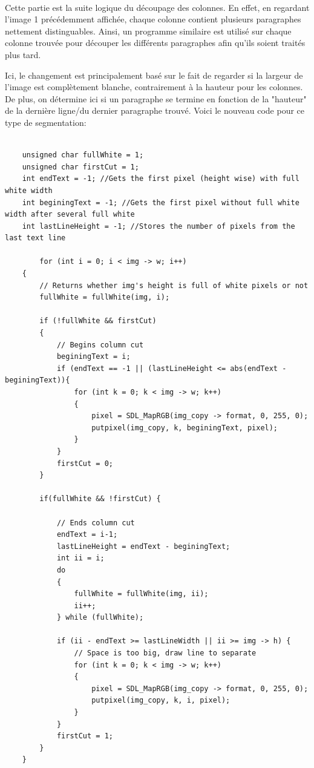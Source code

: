 \documentclass{article}
\begin{document}
	\paragraph{}
	Cette partie est la suite logique du découpage des colonnes. En effet, en regardant l'image 1 précédemment affichée, chaque colonne contient plusieurs paragraphes nettement distinguables. Ainsi, un programme similaire est utilisé sur chaque colonne trouvée pour découper les différents paragraphes afin qu'ils soient traités plus tard.
	\par
	Ici, le changement est principalement basé sur le fait de regarder si la largeur de l'image est complètement blanche, contrairement à la hauteur pour les colonnes. De plus, on détermine ici si un paragraphe se termine en fonction de la "hauteur" de la dernière ligne/du dernier paragraphe trouvé. Voici le nouveau code pour ce type de segmentation: \\
	
	\begin{lstlisting}
    
    unsigned char fullWhite = 1;
    unsigned char firstCut = 1;
    int endText = -1; //Gets the first pixel (height wise) with full white width
    int beginingText = -1; //Gets the first pixel without full white width after several full white 
    int lastLineHeight = -1; //Stores the number of pixels from the last text line
    
		for (int i = 0; i < img -> w; i++) 
    {
        // Returns whether img's height is full of white pixels or not
        fullWhite = fullWhite(img, i);

        if (!fullWhite && firstCut)
        {   
            // Begins column cut
            beginingText = i;
            if (endText == -1 || (lastLineHeight <= abs(endText - beginingText)){
                for (int k = 0; k < img -> w; k++)
                {
                    pixel = SDL_MapRGB(img_copy -> format, 0, 255, 0);
                    putpixel(img_copy, k, beginingText, pixel);
                }   
            }
            firstCut = 0;
        }
        
        if(fullWhite && !firstCut) {
        
            // Ends column cut
            endText = i-1;
            lastLineHeight = endText - beginingText;
            int ii = i;
            do
            {
                fullWhite = fullWhite(img, ii);
                ii++;
            } while (fullWhite);
            
            if (ii - endText >= lastLineWidth || ii >= img -> h) {
                // Space is too big, draw line to separate
                for (int k = 0; k < img -> w; k++)
                {
                    pixel = SDL_MapRGB(img_copy -> format, 0, 255, 0);
                    putpixel(img_copy, k, i, pixel);
                }
            }
            firstCut = 1;
        }
    }	
	\end{lstlisting}
	
\end{document}
